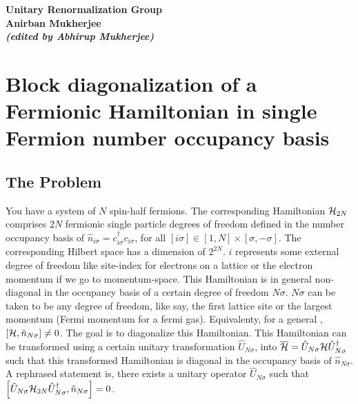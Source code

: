 \documentclass{article}
\newcommand{\un}{\ensuremath{\hat{U}_{N\sigma}}}
\newcommand{\no}{\ensuremath{\hat{n}_{N\sigma}}}
\newcommand{\hml}{\ensuremath{\ham_{2N}}}
\begin{document}
\begin{center}
\bf{\Large{Unitary Renormalization Group}}\\
\vspace{5mm}
\bf{\Large{Anirban Mukherjee} } \\
\bf{\it{\large{(edited by Abhirup Mukherjee)}}} \\
\vspace{5mm}
\end{center}
\section{Block diagonalization of a Fermionic Hamiltonian in single Fermion number occupancy basis}
\subsection{The Problem} You have a system of \(N\) spin-half fermions. The corresponding Hamiltonian \(\hml\) comprises \(2N\) fermionic single particle degrees of freedom defined in the number occupancy basis of \(\hat{n}_{i\sigma} = c^\dagger_{i\sigma}c_{i\sigma}\), for all \([i\sigma]\in[1,N]\times[\sigma,-\sigma]\). The corresponding Hilbert space has a dimension of \(2^{2N}\). \(i\) represents some external degree of freedom like site-index for electrons on a lattice or the electron momentum if we go to momentum-space. This Hamiltonian is in general non-diagonal in the occupancy basis of a certain degree of freedom \(N\sigma\). \(N\sigma\) can be taken to be any degree of freedom, like say, the first lattice site or the largest momentum (Fermi momentum for a fermi gas). Equivalenty, for a general \ham, \(\left[{\mathcal{H}, \hat{n}_{N\sigma}}\right]\neq 0\). The goal is to diagonalize this Hamiltonian. 
\btm
This Hamiltonian can be transformed using a certain unitary transformation \un, into \(\overline{\ham} = \un \ham \un^\dagger\) such that this transformed Hamiltonian is diagonal in the occupancy basis of \(\hat{n}_{N\sigma}\). A rephrased statement is, there exists a unitary operator \(\un\) such that \(\qq{\un \hml \un^\dagger, \no}=0\).
\etm
\end{document}
